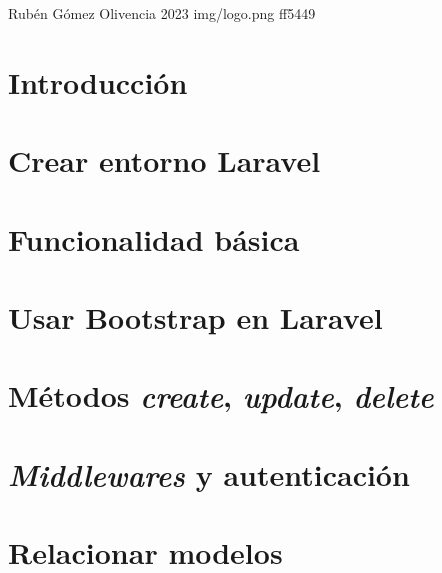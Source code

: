 \documentclass{\ClassPath/yukibook}
\begin{document}
    {Rubén Gómez Olivencia}  %
    {2023}    %
    {} %
    {} %
    {} %
    {img/logo.png} %
    {ff5449}
    {} %

    \coverpage
    \graphicspath{{../../yukibook.cls/}}
    \licensepage
    \tableofcontents

    \graphicspath{{img/}}

    \part{Introducción}
    
    

    \part{Crear entorno Laravel}
    
    

    \part{Funcionalidad básica}
    

    \part{Usar Bootstrap en Laravel}
    

    \part{Métodos \textit{create}, \textit{update}, \textit{delete}}
    

    \part{\textit{Middlewares} y autenticación}
    

    \part{Relacionar modelos}
    

\end{document}
